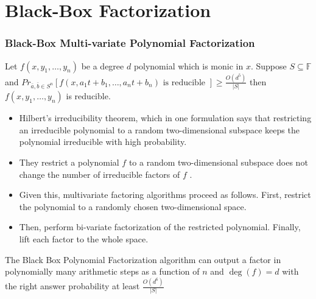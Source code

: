 \documentclass[10pt]{beamer}
\begin{document}

\section{Black-Box Factorization}
\begin{frame}[allowframebreaks]
	\frametitle{Black-Box Multi-variate Polynomial Factorization}
	
	\begin{theorem}
		Let $f\left(x, y_1, \ldots, y_n\right)$ be a degree $d$ polynomial which is monic in $x$. Suppose $S \subseteq \mathbb{F}$ and ${Pr}_{\bar{a}, \bar{b} \in S^n}\left[f\left(x, a_1 t+b_1, \ldots, a_n t+b_n\right) \text { is reducible }\right] \geq \frac{O\left(d^5\right)}{|S|}$ then $f\left(x, y_1, \ldots, y_n\right)$ is reducible.
	\end{theorem}
	
	\begin{itemize}
		\item  Hilbert’s irreducibility theorem, which in one formulation says that restricting an irreducible polynomial to a random two-dimensional subspace keeps the polynomial irreducible with high probability. 
		\item They restrict a polynomial $f$ to a random two-dimensional subspace does not change the number of irreducible factors of $f$ . 
		\item Given this, multivariate factoring algorithms proceed as follows. First, restrict the polynomial to a randomly chosen two-dimensional space. 
		\item Then, perform bi-variate factorization of the restricted polynomial. Finally, lift each factor to the whole space.
	\end{itemize}
	
	\begin{theorem}
	    The Black Box Polynomial Factorization algorithm can  output a factor in polynomially many arithmetic steps as a function of $n$ and $\deg(f)=d$ with the right answer probability at least $\frac{O(d^6)}{|S|}$ 
	\end{theorem}
\end{frame}
\end{document}
